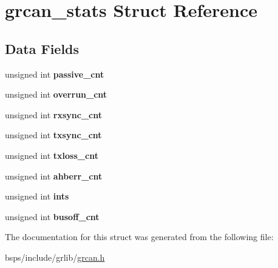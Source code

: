 \hypertarget{structgrcan__stats}{}\section{grcan\+\_\+stats Struct Reference}
\label{structgrcan__stats}
\subsection*{Data Fields}
\begin{DoxyCompactItemize}
\item 
\mbox{\label{structgrcan__stats_a4d1784fd8e830b62e37010c74965430a}} 
unsigned int {\bfseries passive\+\_\+cnt}
\item 
\mbox{\label{structgrcan__stats_a6eade5f6de62fb0d452c6872c3ebf4fc}} 
unsigned int {\bfseries overrun\+\_\+cnt}
\item 
\mbox{\label{structgrcan__stats_a327b01b9ac8a139929bfc165a23ec249}} 
unsigned int {\bfseries rxsync\+\_\+cnt}
\item 
\mbox{\label{structgrcan__stats_a297e9b6807061af90cb132d88bfb4043}} 
unsigned int {\bfseries txsync\+\_\+cnt}
\item 
\mbox{\label{structgrcan__stats_acee76ad6f9176865b58f1050dc5c39a7}} 
unsigned int {\bfseries txloss\+\_\+cnt}
\item 
\mbox{\label{structgrcan__stats_a6983332aff549f93d8ce85a0faa94585}} 
unsigned int {\bfseries ahberr\+\_\+cnt}
\item 
\mbox{\label{structgrcan__stats_a82d95671ab3f588cd8363666e5113833}} 
unsigned int {\bfseries ints}
\item 
\mbox{\label{structgrcan__stats_a58b3d50da0d108d18969fb8d2dc0cc43}} 
unsigned int {\bfseries busoff\+\_\+cnt}
\end{DoxyCompactItemize}


The documentation for this struct was generated from the following file\+:\begin{DoxyCompactItemize}
\item 
bsps/include/grlib/\mbox{\hyperlink{grcan_8h}{grcan.\+h}}\end{DoxyCompactItemize}
